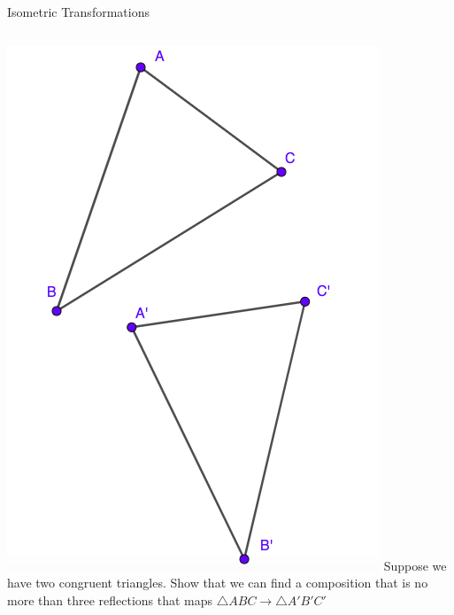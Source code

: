 \documentclass{beamer}
\begin{document}
\begin{frame}{Isometric Transformations}
	\begin{columns}
		\includegraphics[scale=0.3]{cong1.png}
		Suppose we have two congruent triangles. Show that 
		we can find a composition that is no more than 
		three reflections that maps $\triangle ABC\to \triangle
		A'B'C'$
	\end{columns}
\end{frame}
\end{document}
